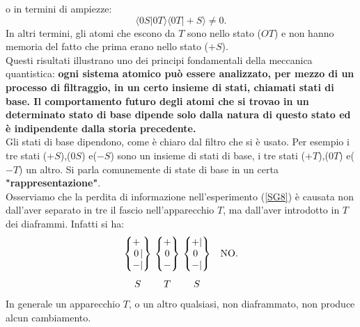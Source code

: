 \documentclass[a4paper,12pt,oneside]{book}
\begin{document}
o in termini di ampiezze:
	\begin{equation}
		\langle 0S | 0T \rangle \langle 0T | +S \rangle \neq 0 .
	\end{equation}
In altri termini, gli atomi che escono da $T$ sono nello stato ($OT$) e non hanno memoria del fatto che prima erano nello stato ($+S$).\\

Questi risultati illustrano uno dei principi fondamentali della meccanica quantistica: \textbf{ogni sistema atomico può essere analizzato, per mezzo di un processo di filtraggio, in un certo insieme di stati, chiamati stati di base. Il comportamento futuro degli atomi che si trovao in un determinato stato di base dipende solo dalla natura di questo stato ed è indipendente dalla storia precedente.}\\
Gli stati di base dipendono, come è chiaro dal filtro che si è usato. Per esempio i tre stati ($+S$),($0S$) e($-S$) sono un insieme di stati di base, i tre stati ($+T$),($0T$) e($-T$) un altro. Si parla comunemente di state di base in un certa \textbf{"rappresentazione"}.\\

Osserviamo che la perdita di informazione nell'esperimento (\ref{SG8}) è causata non dall'aver separato in tre il fascio nell'apparecchio $T$, ma dall'aver introdotto in $T$ dei diaframmi. Infatti si ha:
	\begin{equation}
		\begin{matrix}
		\begin{Bmatrix}
 			\makebox[\widthof{$-$}]{$+$}\makebox[\widthof{$|$}]{$\ $} \\ \makebox[\widthof{$-$}]{$0$}|\\ - | 
		\end{Bmatrix} \\[0.7cm]
			S
		\end{matrix} \
		\begin{matrix}
		\begin{Bmatrix}
			+ \\ 0 \\ - 
		\end{Bmatrix}  \\[0.7cm]
			T
		\end{matrix}\
		\begin{matrix}
		\begin{Bmatrix}
			\makebox[\widthof{$-$}]{$+$} | \\ \makebox[\widthof{$-$}]{$0$}\makebox[\widthof{$|$}]{$\ $}\\ - | 
		\end{Bmatrix} &\textrm{NO.} \\[0.7cm]
			S &
		\end{matrix}
	\label{SG9}
	\end{equation}
In generale un apparecchio $T$, o un altro qualsiasi, non diaframmato, non produce alcun cambiamento.\\
\end{document}
